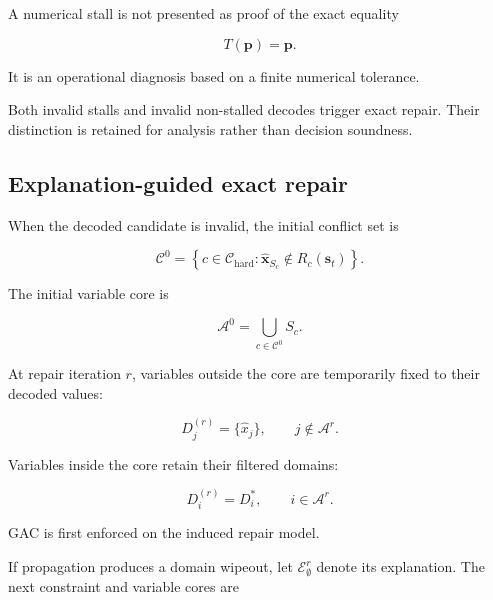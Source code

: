 \documentclass[pdflatex,sn-mathphys-num,iicol,oneside]{sn-jnl}
\begin{document}
A numerical stall is not presented as proof of the exact equality

\begin{equation}
T(\bm{p})=\bm{p}.
\end{equation}

It is an operational diagnosis based on a finite numerical tolerance.

Both invalid stalls and invalid non-stalled decodes trigger exact
repair. Their distinction is retained for analysis rather than
decision soundness.

\subsection{Explanation-guided exact repair}
\label{sec:repair}

When the decoded candidate is invalid, the initial conflict set is

\begin{equation}
\mathcal{C}^{0}
=
\left\{
c\in\mathcal{C}_{\mathrm{hard}}:
\widehat{\bm{x}}_{S_c}
\notin R_c(\bm{s}_t)
\right\}.
\label{eq:initial-conflicts}
\end{equation}

The initial variable core is

\begin{equation}
\mathcal{A}^{0}
=
\bigcup_{c\in\mathcal{C}^{0}}S_c.
\label{eq:initial-core}
\end{equation}

At repair iteration $r$, variables outside the core are temporarily
fixed to their decoded values:

\begin{equation}
D_j^{(r)}
=
\{\widehat{x}_j\},
\qquad
j\notin\mathcal{A}^{r}.
\label{eq:boundary-fixing}
\end{equation}

Variables inside the core retain their filtered domains:

\begin{equation}
D_i^{(r)}
=
D_i^{*},
\qquad
i\in\mathcal{A}^{r}.
\label{eq:core-domain}
\end{equation}

GAC is first enforced on the induced repair model.

If propagation produces a domain wipeout, let
$\mathcal{E}_{\emptyset}^{r}$ denote its explanation. The next
constraint and variable cores are
\end{document}
